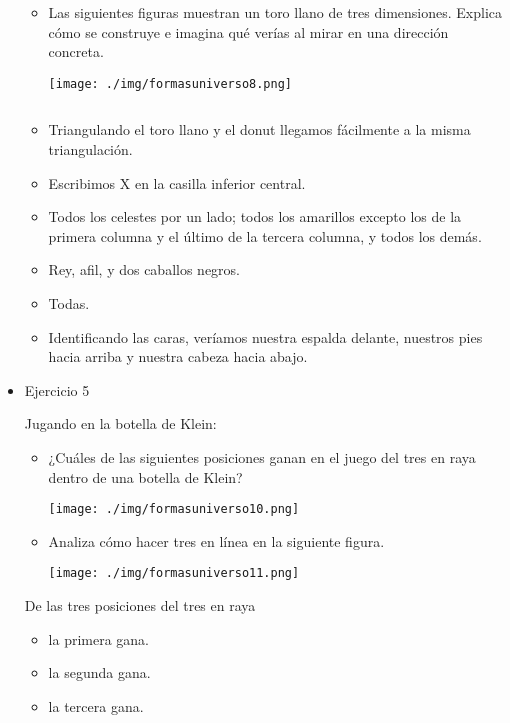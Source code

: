 \documentclass[11pt]{article}
\begin{document}
\begin{itemize}
\begin{statement}
\begin{itemize}
\item Las siguientes figuras muestran un toro llano de tres dimensiones.
Explica cómo se construye e imagina qué verías al mirar en una dirección
concreta.

\texttt{[image: ./img/formasuniverso8.png]}
\end{itemize}

$\quad$
\end{statement}

\begin{itemize}
\item Triangulando el toro llano y el donut llegamos fácilmente a la misma
triangulación.
\item Escribimos X en la casilla inferior central.
\item Todos los celestes por un lado; todos los amarillos excepto los de la
primera columna y el último de la tercera columna, y todos los demás.
\item Rey, afil, y dos caballos negros.
\item Todas.
\item Identificando las caras, veríamos nuestra espalda delante, nuestros pies
hacia arriba y nuestra cabeza hacia abajo.
\end{itemize}

\item Ejercicio 5
\label{sec-5-3-1-5}
\begin{statement}
Jugando en la botella de Klein:

\begin{itemize}
\item ¿Cuáles de las siguientes posiciones ganan en el juego del tres en
raya dentro de una botella de Klein?

\texttt{[image: ./img/formasuniverso10.png]}

\item Analiza cómo hacer tres en línea en la siguiente figura.

\texttt{[image: ./img/formasuniverso11.png]}
\end{itemize}
\end{statement}

De las tres posiciones del tres en raya

\begin{itemize}
\item la primera gana.
\item la segunda gana.
\item la tercera gana.
\end{itemize}


\end{itemize}
\end{document}
